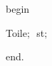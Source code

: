 {\vspace{\neglskip}\mbox{\blc  \idt  \mcl begin\idt }\par 
\vspace{\neglskip}\mbox{\blc  \blk\idt  Toile$;$\ st$;$}\par 
\vspace{\neglskip}\mbox{\blc  \idt  \mcl end\idt $.$}\par 

\medskip }

